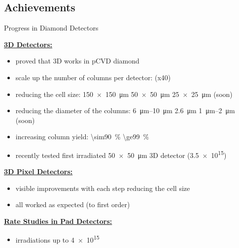 \subsection{Achievements}
\begin{frame}{Progress in Diamond Detectors}

	\textbf{\underline{3D Detectors:}}\vspace*{5pt}
	\begin{itemize}\itemfill
		\item proved that 3D works in pCVD diamond
		\item scale up the number of columns per detector:  \ra {} (x40)
		\item reducing the cell size: \SI{150x150}{\micro\meter} \ra \SI{50x50}{\micro\meter} \ra \SI{25x25}{\micro\meter} (soon)
		\item reducing the diameter of the columns: \SIrange{6}{10}{\micro\meter} \ra \SI{2.6}{\micro\meter} \ra \SIrange{1}{2}{\micro\meter} (soon)
		\item \ra increasing column yield: \SI{\sim90}{\%} \ra \SI{\ge99}{\%}
		\item recently tested first irradiated \SI{50x50}{\micro\meter} 3D detector (\SI{3.5e15}{\ncm})
	\end{itemize}
	
	\vspace*{5pt}\textbf{\underline{3D Pixel Detectors:}}\vspace*{5pt}
	\begin{itemize}\itemfill
		\item visible improvements with each step reducing the cell size
		\item all worked as expected (to first order)
	\end{itemize}
	
	\vspace*{5pt}\textbf{\underline{Rate Studies in Pad Detectors:}}\vspace*{5pt}
	\begin{itemize}\itemfill
		\item irradiations up to \SI{4e15}{\ncm}
	\end{itemize}


\end{frame}
